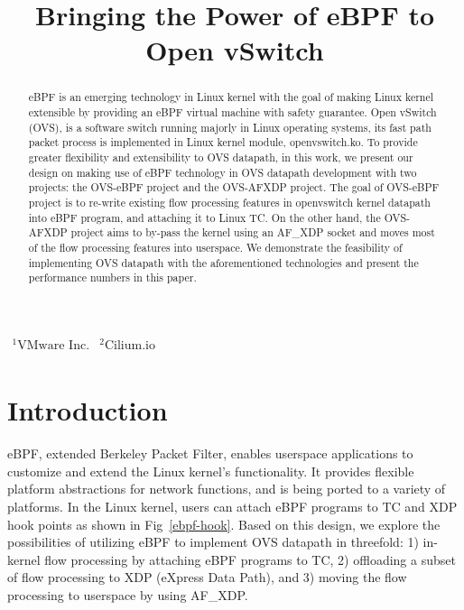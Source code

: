 \documentclass[10pt,numbers,reprint]{sigplanconf}
\begin{document}
\title{Bringing the Power of eBPF to Open vSwitch}
{
  \(
  \begin{matrix}
    \textrm{$^1$VMware Inc.} & \textrm{$^2$Cilium.io}\\
  \end{matrix}
  \)
}{}

\maketitle

\begin{abstract}
eBPF is an emerging technology in Linux kernel with the goal of making Linux kernel
extensible by providing an eBPF virtual machine with safety guarantee.
Open vSwitch (OVS), is a software switch running majorly in Linux
operating systems, its fast path packet process is implemented in Linux kernel
module, openvswitch.ko.
To provide greater flexibility and extensibility to OVS datapath, in this
work, we present our design on making use of eBPF technology in OVS datapath
development with two projects: the OVS-eBPF project and the OVS-AFXDP project.
The goal of OVS-eBPF project is to re-write existing flow processing features
in openvswitch kernel datapath into eBPF program, and attaching it
to Linux TC.
On the other hand, the OVS-AFXDP project aims to by-pass the kernel
using an AF\_XDP socket and moves most of the flow processing features
into userspace.
We demonstrate the feasibility of implementing OVS datapath with the
aforementioned technologies and present the performance numbers in this paper.
\end{abstract}

\section{Introduction}\label{introduction}

eBPF, extended Berkeley Packet Filter, enables userspace applications to
customize and extend the Linux kernel's functionality. It provides
flexible platform abstractions for network functions, and is being ported
to a variety of platforms. In the Linux kernel, users can attach eBPF programs
to TC and XDP hook points as shown in Fig~\ref{ebpf-hook}. Based on this
design, we explore the possibilities of utilizing eBPF to implement OVS
datapath in threefold:
1) in-kernel flow processing by attaching eBPF programs to TC,
2) offloading a subset of flow processing to XDP (eXpress Data Path),
and 3) moving the flow processing to userspace by using AF\_XDP.
\end{document}
